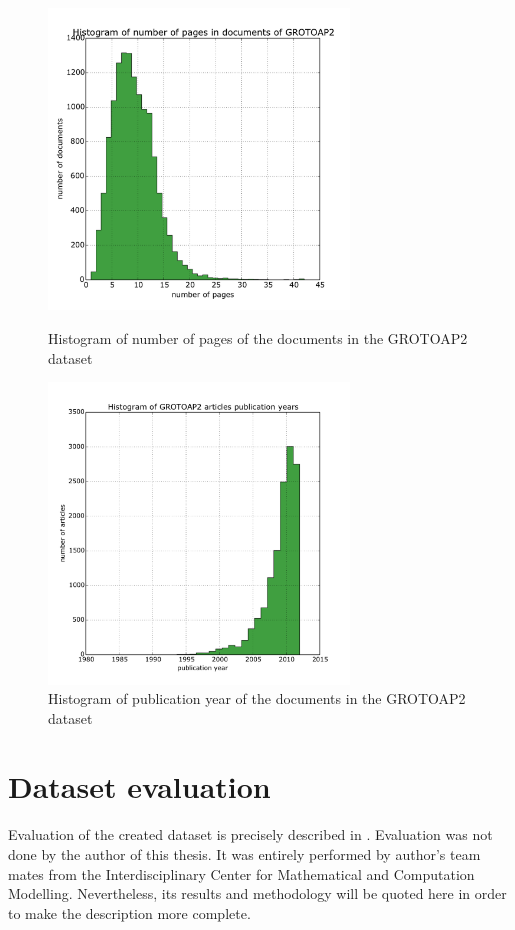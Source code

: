 \begin{figure}
  \centering
\begin{minipage}[t!]{0.45\linewidth}
  \includegraphics[width=8cm]{plots/pages_histogram}
  \caption{Histogram of number of pages of the documents in the GROTOAP2 dataset}
  \label{fig:page_count_histogram}
\end{minipage}
\quad
\begin{minipage}[t!]{0.45\linewidth}
  \includegraphics[width=8cm]{plots/publication_year_histogram}
  \caption{Histogram of publication year of the documents in the GROTOAP2 dataset}
  \label{fig:publication_year_histogram}
\end{minipage}
\end{figure}

\section{Dataset evaluation}
Evaluation of the created dataset is precisely described in \cite{DominikaTkaczykPaweSzostek2014}. Evaluation was not done by the author of this thesis. It was entirely performed by author's team mates from the Interdisciplinary Center for Mathematical and Computation Modelling. Nevertheless, its results and methodology will be quoted here in order to make the description more complete.

